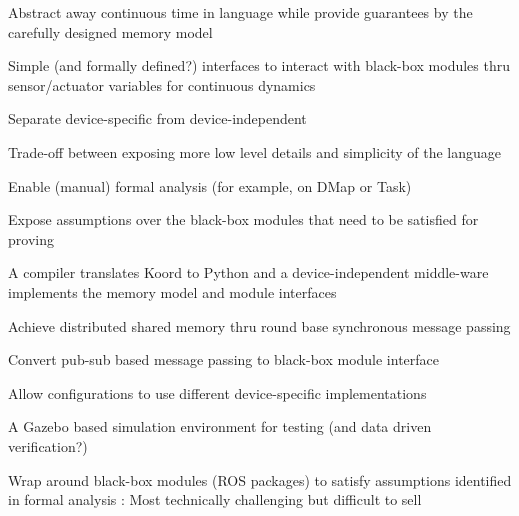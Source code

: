 \begin{noinditem}
\item Abstract away continuous time in language while provide guarantees by the carefully designed memory model
\item Simple (and formally defined?) interfaces to interact with black-box modules thru sensor/actuator variables for continuous dynamics
\item Separate device-specific from device-independent
\item Trade-off between exposing more low level details and simplicity of the language
\item Enable (manual) formal analysis (for example, on DMap or Task)
\item Expose assumptions over the black-box modules that need to be satisfied for proving
\item  A compiler translates Koord to Python and a device-independent middle-ware implements the memory model and module interfaces
\item Achieve distributed shared memory thru round base synchronous message passing
\item Convert pub-sub based message passing to black-box module interface
\item Allow configurations to use different device-specific implementations
\item A Gazebo based simulation environment for testing (and data driven verification?)
\item Wrap around black-box modules (ROS packages) to satisfy assumptions identified in formal analysis : Most technically challenging but difficult to sell
\item {}

\end{noinditem}

%
%
%



